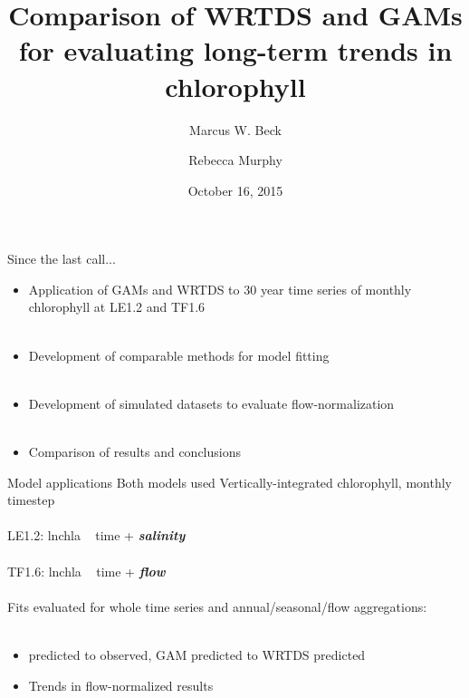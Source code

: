 \documentclass[serif]{beamer}\usepackage[]{graphicx}\usepackage[]{color}
\newcommand{\Bigtxt}[1]{\textbf{\textit{#1}}}
\begin{document}
\title[Comparison of WRTDS and GAMs]{Comparison of WRTDS and GAMs for evaluating long-term trends in chlorophyll}

\author[Beck, Murphy]{Marcus W. Beck \and Rebecca Murphy}

\date{October 16, 2015}


\begin{frame}
\titlepage
\end{frame}

\begin{frame}{Since the last call...}
\begin{itemize}
\item Application of GAMs and WRTDS to 30 year time series of monthly chlorophyll at LE1.2 and TF1.6 \\~\\
\item Development of comparable methods for model fitting \\~\\
\item Development of simulated datasets to evaluate flow-normalization \\~\\
\item Comparison of results and conclusions
\end{itemize}
\end{frame}

\begin{frame}{Model applications}
Both models used Vertically-integrated chlorophyll, monthly timestep \\~\\
LE1.2: lnchla ~ time + \Bigtxt{salinity} \\~\\
TF1.6: lnchla ~ time + \Bigtxt{flow} \\~\\
Fits evaluated for whole time series and annual/seasonal/flow aggregations: \\~\\
\begin{itemize}
\item predicted to observed, GAM predicted to WRTDS predicted
\item Trends in flow-normalized results
\end{itemize}
\end{frame}
\end{document}
